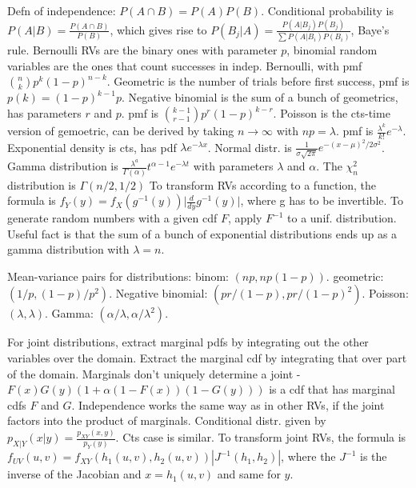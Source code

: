 \documentclass{article}
\begin{document}
\small
Defn of independence: $P(A\cap B)=P(A)P(B)$. Conditional probability is $P(A|B)=\frac{P(A\cap B)}{P(B)}$, which gives rise to $P(B_j|A)=\frac{P(A|B_j)P(B_j)}{\sum P(A|B_i)P(B_i)}$, Baye's rule. Bernoulli RVs are the binary ones with parameter $p$, binomial random variables are the ones that count successes in indep. Bernoulli, with pmf $\binom{n}{k}p^k(1-p)^{n-k}$. Geometric is the number of trials before first success, pmf is $p(k)=(1-p)^{k-1}p$. Negative binomial is the sum of a bunch of geometrics, has parameters $r$ and $p$. pmf is $\binom{k-1}{r-1}p^r(1-p)^{k-r}$. 
Poisson is the cts-time version of gemoetric, can be derived by taking $n\to\infty$ with $np=\lambda$. pmf is $\frac{\lambda^k}{k!}e^{-\lambda}$. Exponential density is cts, has pdf $\lambda e^{-\lambda x}$. Normal distr. is $\frac{1}{\sigma\sqrt{2\pi}}e^{-(x-\mu)^2/2\sigma^2}$. Gamma distribution is $\frac{\lambda^a}{\Gamma(\alpha)}t^{\alpha-1}e^{-\lambda t}$ with parameters $\lambda$ and $\alpha$. The $\chi^2_n$ distribution is $\Gamma(n/2,1/2)$ To transform RVs according to a function, the formula is $f_Y(y)=f_X(g^{-1}(y))\big|\frac{d}{dy}g^{-1}(y)\big|$, where g has to be invertible. To generate random numbers with a given cdf $F$, apply $F^{-1}$ to a unif. distribution. Useful fact is that the sum of a bunch of exponential distributions ends up as a gamma distribution with $\lambda=n$.

Mean-variance pairs for distributions: binom: $(np,np(1-p))$. geometric: $(1/p, (1-p)/p^2)$. Negative binomial: $(pr/(1-p),pr/(1-p)^2)$. Poisson: $(\lambda,\lambda)$. Gamma: $(\alpha/\lambda, \alpha/\lambda^2)$.

For joint distributions, extract marginal pdfs by integrating out the other variables over the domain. Extract the marginal cdf by integrating that over part of the domain. Marginals don't uniquely determine a joint - $F(x)G(y)(1+\alpha(1-F(x))(1-G(y)))$ is a cdf that has marginal cdfs $F$ and $G$. 
Independence works the same way as in other RVs, if the joint factors into the product of marginals. Conditional distr. given by $p_{X|Y}(x|y)=\frac{p_{XY}(x,y)}{p_Y(y)}$. Cts case is similar. To transform joint RVs, the formula is $f_{UV}(u,v)=f_{XY}(h_1(u,v),h_2(u,v))|J^{-1}(h_1,h_2)|$, where the $J^{-1}$ is the inverse of the Jacobian and $x=h_1(u,v)$ and same for $y$. 
\end{document}

